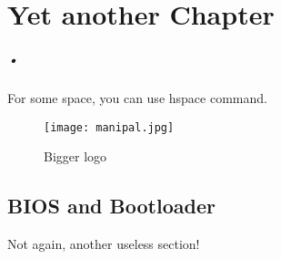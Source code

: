 

\chapter{Yet another Chapter}
\label{second_chapter}
\paragraph*{•}

\hspace{8mm} 

\noindent For some space, you can use hspace command.


\begin{figure}[h]
  \centering
    \texttt{[image: manipal.jpg]}
    \caption{Bigger logo}
    \label{fig:big_manipal}
\end{figure}

\clearpage
\section{BIOS and Bootloader}

Not again, another useless section!
